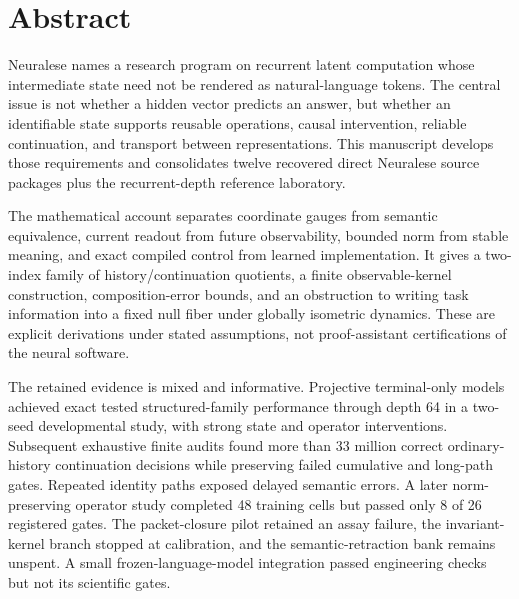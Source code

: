 \documentclass[11pt]{article}
\begin{document}
\KomorebiCover
{}


\section*{Abstract}
Neuralese names a research program on recurrent latent computation whose intermediate state need not be rendered as natural-language tokens. The central issue is not whether a hidden vector predicts an answer, but whether an identifiable state supports reusable operations, causal intervention, reliable continuation, and transport between representations. This manuscript develops those requirements and consolidates twelve recovered direct Neuralese source packages plus the recurrent-depth reference laboratory.

The mathematical account separates coordinate gauges from semantic equivalence, current readout from future observability, bounded norm from stable meaning, and exact compiled control from learned implementation. It gives a two-index family of history/continuation quotients, a finite observable-kernel construction, composition-error bounds, and an obstruction to writing task information into a fixed null fiber under globally isometric dynamics. These are explicit derivations under stated assumptions, not proof-assistant certifications of the neural software.

The retained evidence is mixed and informative. Projective terminal-only models achieved exact tested structured-family performance through depth 64 in a two-seed developmental study, with strong state and operator interventions. Subsequent exhaustive finite audits found more than 33 million correct ordinary-history continuation decisions while preserving failed cumulative and long-path gates. Repeated identity paths exposed delayed semantic errors. A later norm-preserving operator study completed 48 training cells but passed only 8 of 26 registered gates. The packet-closure pilot retained an assay failure, the invariant-kernel branch stopped at calibration, and the semantic-retraction bank remains unspent. A small frozen-language-model integration passed engineering checks but not its scientific gates.
\end{document}
